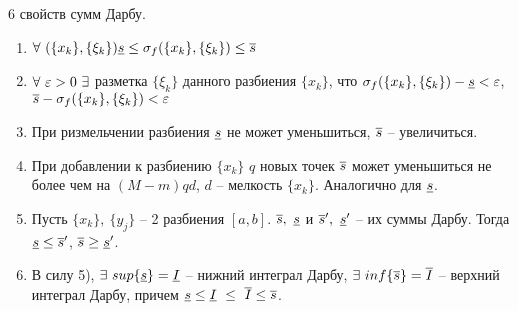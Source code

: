 \begin{theor}
6 свойств сумм Дарбу.
\begin{enumerate}
\item $\forall\ (\{x_k\},\{\xi_k\}) \underline{s}\leq\sigma_f(\{x_k\},\{\xi_k\})\leq\overline{s}$
\item $\forall\ \varepsilon>0\ \exists$ разметка $\{\xi_k\}$ данного разбиения $\{x_k\}$, что $\sigma_f(\{x_k\},\{\xi_k\})-\underline{s}<\varepsilon$, $\overline{s}-\sigma_f(\{x_k\},\{\xi_k\})<\varepsilon$
\item При ризмельчении разбиения $\underline{s}$ не может уменьшиться, $\overline{s}$ -- увеличиться.
\item При добавлении к разбиению $\{x_k\}$ $q$ новых точек $\overline{s}$ может уменьшиться не более чем на $(M-m)qd$, $d$ -- мелкость $\{x_k\}$. Аналогично для $\underline{s}$.
\item Пусть $\{x_k\},\ \{y_j\}$ -- 2 разбиения $[a,b]$. $\overline{s},\ \underline{s}$ и $\overline{s}',\ \underline{s}'$ -- их суммы Дарбу. Тогда $\underline{s}\leq\overline{s}'$, $\overline{s}\geq\underline{s}'$.
\item В силу 5), $\exists\ sup\{\ns\}=\underline{I}$ -- нижний интеграл Дарбу, $\exists\ inf\{\overline{s}\}=\overline{I}$ -- верхний интеграл Дарбу, причем $\ns\leq\underline{I}\ \leq\ \overline{I}\leq\vs$.
\end{enumerate}
\end{theor}
